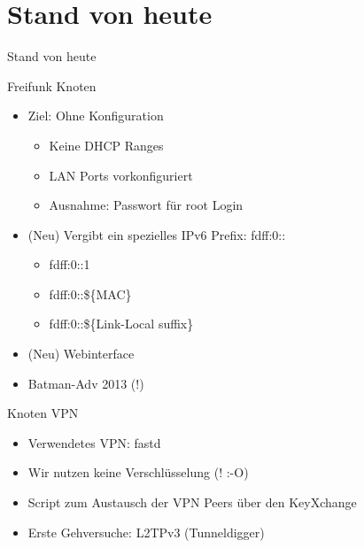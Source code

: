 \section{Stand von heute}
\begin{frame}{}
    \begin{center}
        Stand von heute
     \end{center}
\end{frame}

\begin{frame}{Freifunk Knoten}
    \begin{itemize}
        \item Ziel: Ohne Konfiguration
        \begin{itemize}
            \item Keine DHCP Ranges
            \item LAN Ports vorkonfiguriert
            \item Ausnahme: Passwort für root Login
        \end{itemize}
        \item (Neu) Vergibt ein spezielles IPv6 Prefix: fdff:0::
        \begin{itemize}
            \item fdff:0::1
            \item fdff:0::\$\{MAC\}
            \item fdff:0::\$\{Link-Local suffix\}
        \end{itemize}
        \item (Neu) Webinterface
        \item Batman-Adv 2013 (!)
    \end{itemize}
\end{frame}

\begin{frame}{Knoten VPN}
    \begin{itemize}
        \item Verwendetes VPN: fastd
        \item Wir nutzen keine Verschlüsselung (! :-O)
        \item Script zum Austausch der VPN Peers über den KeyXchange
        \item Erste Gehversuche: L2TPv3 (Tunneldigger)
    \end{itemize}
\end{frame}

